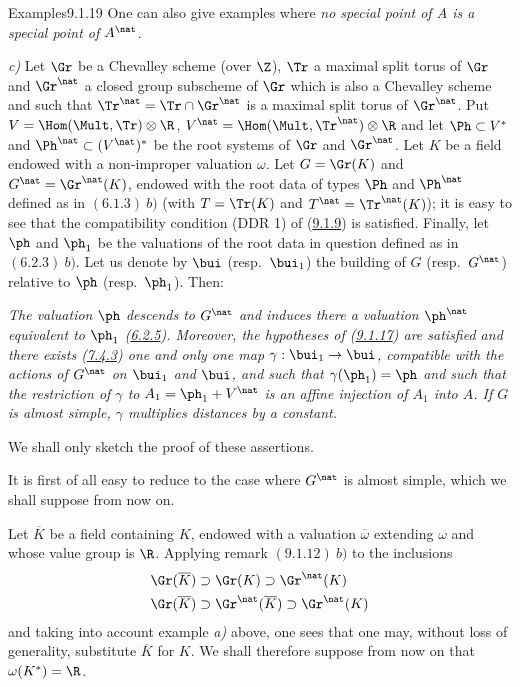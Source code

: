 \documentclass[12pt,a4paper,oneside,english]{smfart}
\makeatletter
\newcommand{\btpageanchor}[1]{\Hy@raisedlink{\hypertarget{p:#1}{}}}
\newcommand{\btref}[1]{\hyperlink{bt:#1}{#1}}
\newcommand{\btpage}[1]{\marginnote{p.~#1}\btpageanchor{#1}}
\newcommand{\pg}[1]{\btpage{#1}}
\theoremstyle{definition}
\theoremstyle{bt}
\makeatother
\begin{document}
\begin{stmtup}{Examples}{9.1.19}
One can also give examples where \emph{no special point of $A$ is a special point of
$A^\nat$}.

\medskip
\textit{c)} Let $\Gr$ be a Chevalley scheme (over $\Z$), $\Tr$ a maximal split torus of
$\Gr$ and $\Gr^\nat$ a closed group subscheme of $\Gr$ which is also a Chevalley scheme
and such that $\Tr^\nat=\Tr\cap\Gr^\nat$ is a maximal split torus of $\Gr^\nat$. Put
$V=\Hom(\Mult,\Tr)\otimes\R$, $V^\nat=\Hom(\Mult,\Tr^\nat)\otimes\R$ and let
$\Ph\subset V^*$ and $\Ph^\nat\subset(V^\nat)^*$ be the root systems of $\Gr$ and
$\Gr^\nat$. Let $K$ be a field endowed with a non-improper valuation $\omega$. Let
$G=\Gr(K)$ and $G^\nat=\Gr^\nat(K)$, endowed with the root data of types $\Ph$ and
$\Ph^\nat$ defined as in $(6.1.3)\ b)$ (with $T=\Tr(K)$ and $T^\nat=\Tr^\nat(K)$); it is
easy to see that the compatibility condition (DDR 1) of (\btref{9.1.9}) is satisfied. Finally,
let $\ph$ and $\ph_1$ be the valuations of the root data in question defined as in
$(6.2.3)\ b)$. Let us denote by $\bui$ (resp.\ $\bui_1$) the building of $G$
(resp.\ $G^\nat$) relative to $\ph$ (resp.\ $\ph_1$). Then:

\emph{The valuation $\ph$ descends to $G^\nat$ and induces there a valuation $\ph^\nat$
equivalent to $\ph_1$ (\btref{6.2.5}). Moreover, the hypotheses of (\btref{9.1.17}) are satisfied and
there exists (\btref{7.4.3}) one and only one map $\gamma:\bui_1\to\bui$, compatible with the
actions of $G^\nat$ on $\bui_1$ and $\bui$, and such that $\gamma(\ph_1)=\ph$ and such
that the restriction of $\gamma$ to $A_1=\ph_1+V^\nat$ is an affine injection of $A_1$
into $A$. If $G$ is almost simple, $\gamma$ multiplies distances by a constant.}

We shall only sketch the proof of these assertions.

It is first of all easy to reduce to the case where $G^\nat$ is almost simple, which we
shall suppose from now on.

Let $\overline K$ be a field containing $K$, endowed with a valuation
$\overline\omega$ extending $\omega$ and whose value group is $\R$. Applying remark
$(9.1.12)\ b)$ to the inclusions
\begin{align*}
&\Gr(\overline K)\supset\Gr(K)\supset\Gr^\nat(K)\\
&\Gr(\overline K)\supset\Gr^\nat(\overline K)\supset\Gr^\nat(K)
\end{align*}
\pg{204}
and taking into account example \textit{a)} above, one sees that one may, without loss
of generality, substitute $\overline K$ for $K$. We shall therefore suppose from now on
that $\omega(K^*)=\R$.


\end{stmtup}
\end{document}
